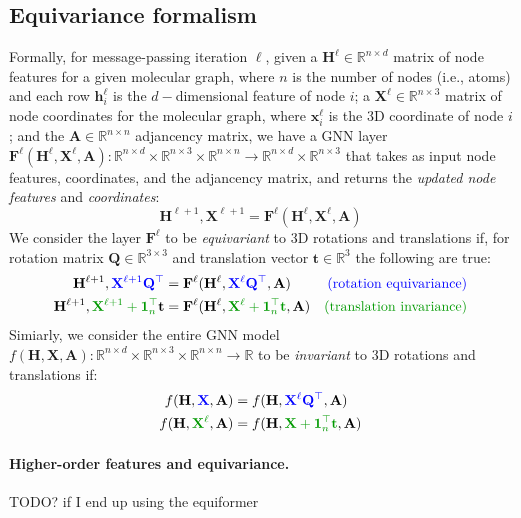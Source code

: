 \subsection{Equivariance formalism}
Formally, for message-passing iteration $\ell$, given a $\mathbf{H}^{\ell}\in\mathbb{R}^{n \times d}$ matrix of node features for a given molecular graph, where $n$ is the number of nodes (i.e., atoms) and each row $\mathbf{h}^{\ell}_i$ is the $d-$dimensional feature of node $i$; a $\textbf{X}^{\ell}\in \mathbb{R}^{n \times 3}$ matrix of node coordinates for the molecular graph, where $\mathbf{x}^{\ell}_i$ is the 3D coordinate of node $i$; and the $\mathbf{A}\in\mathbb{R}^{n \times n}$ adjancency matrix, 
we have a GNN layer $\mathbf{F}^{\ell}(\mathbf{H}^{\ell}, \mathbf{X}^{\ell}, \mathbf{A}):\mathbb{R}^{n \times d}\times \mathbb{R}^{n \times 3} \times \mathbb{R}^{n \times n} \rightarrow \mathbb{R}^{n \times d} \times \mathbb{R}^{n \times 3}$ that takes as input node features, coordinates, and the adjancency matrix, and returns the \textit{updated node features} and \textit{coordinates}:
\begin{equation}
    \mathbf{H}^{\ell +1},\mathbf{X}^{\ell + 1} = \mathbf{F}^{\ell}(\mathbf{H}^{\ell}, \mathbf{X}^{\ell}, \mathbf{A})
\end{equation} 
We consider the layer $\mathbf{F}^{\ell}$ to be \textit{equivariant} to 3D rotations and translations if, for rotation matrix $\mathbf{Q}\in \mathbb{R}^{3 \times 3}$ and translation vector $\mathbf{t}\in \mathbb{R}^3$ the following are true:
\begin{align}
    \mathbf{H}^{\ell + 1}, {\color{blue}\mathbf{X}^{\ell + 1}\mathbf{Q}^{\top}} &= \mathbf{F}^{\ell}(\mathbf{H}^{\ell}, {\color{blue}\mathbf{X}^{\ell}\mathbf{Q}^{\top}}, \mathbf{A}) &\text{{\color{blue}(rotation equivariance)}} \\
    \mathbf{H}^{\ell + 1}, {\color{green!60!black}\mathbf{X}^{\ell + 1} + \mathbf{1}_n^{\top}}\mathbf{t} &= \mathbf{F}^{\ell}(\mathbf{H}^{\ell}, {\color{green!60!black}\mathbf{X}^{\ell} + \mathbf{1}_n^{\top}\mathbf{t}}, \mathbf{A}) &\text{{\color{green!60!black}(translation invariance)}}
\end{align}
Simiarly, we consider the entire GNN model $f(\mathbf{H}, \mathbf{X}, \mathbf{A}):\mathbb{R}^{n\times d}\times\mathbb{R}^{n\times 3}\times \mathbb{R}^{n \times n} \rightarrow \mathbb{R}$ to be \textit{invariant} to 3D rotations and translations if:
\begin{align}
    f(\mathbf{H}, {\color{blue}\mathbf{X}}, \mathbf{A}) &= f(\mathbf{H}, {\color{blue}\mathbf{X}^{\ell}\mathbf{Q}^{\top}}, \mathbf{A}) \\
    f(\mathbf{H},  {\color{green!60!black}\mathbf{X}^{\ell}}, \mathbf{A}) &= f(\mathbf{H}, {\color{green!60!black}\mathbf{X}+ \mathbf{1}_n^{\top}\mathbf{t}}, \mathbf{A})
\end{align}

\paragraph{Higher-order features and equivariance.}
{\color{red} TODO? if I end up using the equiformer}


